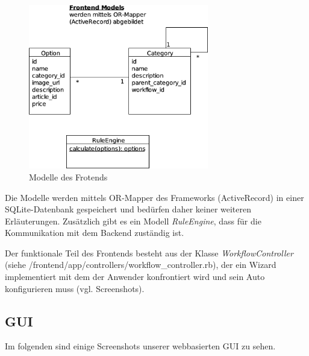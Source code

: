 \documentclass[a4paper,10pt]{article}
\begin{document}
\begin{center}
  \begin{figure}[t]
    \includegraphics[width=0.7\textwidth]{doc/frontend_models.png}
    \caption{Modelle des Frotends}
    \label{frontend_models}
  \end{figure}
\end{center}

Die Modelle werden mittels OR-Mapper des Frameworks (ActiveRecord) in einer SQLite-Datenbank gespeichert und bedürfen daher keiner weiteren Erläuterungen.
Zusätzlich gibt es ein Modell \textit{RuleEngine}, dass für die Kommunikation mit dem Backend zuständig ist.

Der funktionale Teil des Frontends besteht aus der Klasse \textit{WorkflowController} (siehe /frontend/app/controllers/workflow_controller.rb), der ein Wizard implementiert mit dem der Anwender konfrontiert wird und sein Auto konfigurieren muss (vgl. Screenshots).

\subsection*{GUI}

Im folgenden sind einige Screenshots unserer webbasierten GUI zu sehen.
\end{document}
